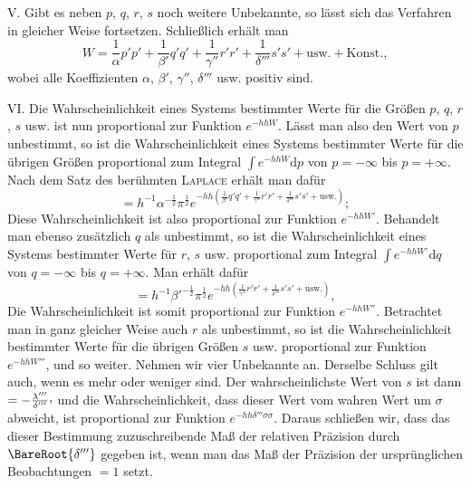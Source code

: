 V. Gibt es neben $p$, $q$, $r$, $s$ noch weitere Unbekannte, so lässt sich das Verfahren in gleicher Weise fortsetzen. Schließlich erhält man
\[
W=\frac{1}{\alpha}p'p'+\frac{1}{\beta'}q'q'+\frac{1}{\gamma''}r'r'
+\frac{1}{\delta'''}s's'+\text{usw.}+\text{Konst.},
\]
wobei alle Koeffizienten $\alpha$, $\beta'$, $\gamma''$, $\delta'''$ usw. positiv sind.

VI. Die Wahrscheinlichkeit eines Systems bestimmter Werte für die Größen $p$, $q$, $r$, $s$ usw. ist nun proportional\HistoricalNoteEight{Handschriftliche Bemerkung:] \emph{Gleich} [dem Produkt] der Funktion[\quad\raisebox{.65ex}{.}
\[
e^{-hh\left(\frac{1}{\alpha}p'p'+\frac{1}{\beta'}q'q'+\frac{1}{\gamma''}r'r'+\frac{1}{\delta'''}s's'+\text{usw.}\right)}
\]
mit dem konstanten Faktor]
$\frac{h^\nu\BareRoot{(\alpha\beta'\gamma''\delta'''\ldots)}}{(\BareRoot{\pi})^\nu}e^{-hh\,\text{Konst.}}$,
wobei Konst. den letzten, konstanten Teil von $W$ bezeichnet.}
 zur Funktion $e^{-hhW}$.
Lässt man also den Wert von $p$ unbestimmt, so ist die Wahrscheinlichkeit eines Systems bestimmter Werte für die übrigen Größen proportional zum Integral $\int e^{-hhW}\mathrm{d}p$ von $p=-\infty$ bis $p=+\infty$. Nach dem Satz des berühmten \textsc{Laplace} erhält man dafür
\[
=h^{-1}\alpha^{-\frac12}\pi^{\frac12}
e^{-hh\left(\frac{1}{\beta'}q'q'+\frac{1}{\gamma''}r'r'+\frac{1}{\delta'''}s's'+\text{usw.}\right)};
\]
Diese Wahrscheinlichkeit ist also proportional zur Funktion $e^{-hhW'}$.
Behandelt man ebenso zusätzlich $q$ als unbestimmt, so ist die Wahrscheinlichkeit eines Systems bestimmter Werte für $r$, $s$ usw. proportional zum Integral $\int e^{-hhW'}\mathrm{d}q$ von $q=-\infty$ bis $q=+\infty$. Man erhält dafür
\[
=h^{-1}{\beta'}^{-\frac12}\pi^{\frac12}
e^{-hh\left(\frac{1}{\gamma''}r'r'+\frac{1}{\delta'''}s's'+\text{usw.}\right)},
\]
Die Wahrscheinlichkeit ist somit proportional zur Funktion $e^{-hhW''}$. Betrachtet man in ganz gleicher Weise auch $r$ als unbestimmt, so ist die Wahrscheinlichkeit bestimmter Werte für die übrigen Größen $s$ usw. proportional zur Funktion $e^{-hhW'''}$, und so weiter. Nehmen wir vier Unbekannte an. Derselbe Schluss gilt auch, wenn es mehr oder weniger sind. Der wahrscheinlichste Wert von $s$ ist dann
$=-\frac{\lambda'''}{\delta'''}\mathpunct{\raisebox{.45ex}{,}}$
und die Wahrscheinlichkeit, dass dieser Wert vom wahren Wert um $\sigma$ abweicht, ist proportional zur Funktion $e^{-hh\delta'''\sigma\sigma}$. Daraus schließen wir, dass das dieser Bestimmung zuzuschreibende Maß der relativen Präzision durch $\BareRoot{\delta'''}$ gegeben ist, wenn man das Maß der Präzision der ursprünglichen Beobachtungen $=1$ setzt.
